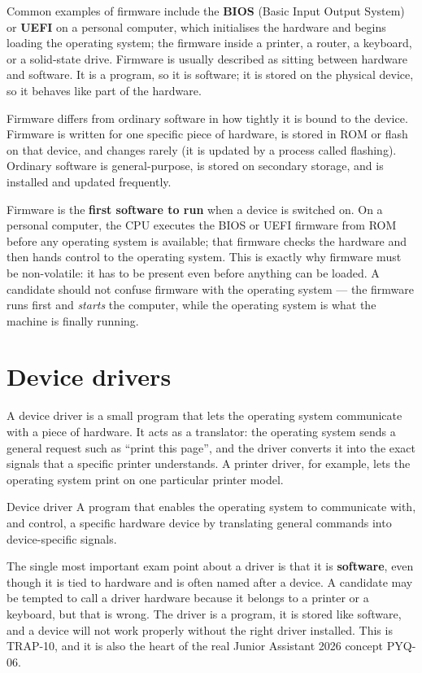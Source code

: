 Common examples of firmware include the \textbf{BIOS} (Basic Input Output
System) or \textbf{UEFI} on a personal computer, which initialises the
hardware and begins loading the operating system; the firmware inside a
printer, a router, a keyboard, or a solid-state drive. Firmware is usually
described as sitting between hardware and software. It is a program, so it is
software; it is stored on the physical device, so it behaves like part of the
hardware.

Firmware differs from ordinary software in how tightly it is bound to the
device. Firmware is written for one specific piece of hardware, is stored in
ROM or flash on that device, and changes rarely (it is updated by a process
called flashing). Ordinary software is general-purpose, is stored on secondary
storage, and is installed and updated frequently.

Firmware is the \textbf{first software to run} when a device is switched on. On
a personal computer, the CPU executes the BIOS or UEFI firmware from ROM before
any operating system is available; that firmware checks the hardware and then
hands control to the operating system. This is exactly why firmware must be
non-volatile: it has to be present even before anything can be loaded. A
candidate should not confuse firmware with the operating system --- the
firmware runs first and \emph{starts} the computer, while the operating system
is what the machine is finally running.

\section{Device drivers}
A device driver is a small program that lets the operating system communicate
with a piece of hardware. It acts as a translator: the operating system sends
a general request such as ``print this page'', and the driver converts it into
the exact signals that a specific printer understands. A printer driver, for
example, lets the operating system print on one particular printer model.

\begin{definitionbox}{Device driver}
A program that enables the operating system to communicate with, and control,
a specific hardware device by translating general commands into
device-specific signals.
\end{definitionbox}

The single most important exam point about a driver is that it is
\textbf{software}, even though it is tied to hardware and is often named after
a device. A candidate may be tempted to call a driver hardware because it
belongs to a printer or a keyboard, but that is wrong. The driver is a program,
it is stored like software, and a device will not work properly without the
right driver installed. This is TRAP-10, and it is also the heart of the real
Junior Assistant 2026 concept PYQ-06.

